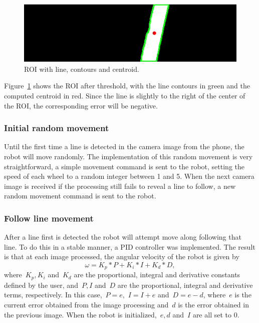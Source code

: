 \documentclass[10pt,conference,compsoc]{IEEEtran}
\begin{document}
\begin{figure}[thpb]
\centering
\includegraphics[scale=0.4]{img/roi.png}
\caption{ROI with line, contours and centroid.}
\label{fig:roi}
\end{figure}

Figure~\ref{fig:roi} shows the ROI after threshold, with the line contours in green and the computed centroid in red. Since the line is slightly to the right of the center of the ROI, the corresponding error will be negative.

\subsubsection{Initial random movement}

Until the first time a line is detected in the camera image from the phone, the robot will move randomly. The implementation of this random movement is very straightforward, a simple movement command is sent to the robot, setting the speed of each wheel to a random integer between 1 and 5. When the next camera image is received if the processing still fails to reveal a line to follow, a new random movement command is sent to the robot.

\subsubsection{Follow line movement}

After a line first is detected the robot will attempt move along following that line. To do this in a stable manner, a PID controller was implemented. The result is that at each image processed, the angular velocity of the robot is given by $$\omega = K_p * P + K_i * I + K_d * D,$$ where~$K_p, K_i$ and~$K_d$ are the proportional, integral and derivative constants defined by the user, and~$P, I$ and~$D$ are the proportional, integral and derivative terms, respectively. In this case,~$P = e$,~$I = I + e$ and~$D = e - d$, where~$e$ is the current error obtained from the image processing and~$d$ is the error obtained in the previous image. When the robot is initialized,~$e, d$ and~$I$ are all set to 0.
\end{document}

